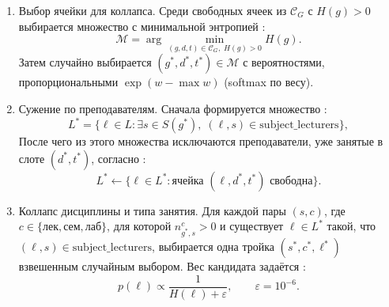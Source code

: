 \begin{enumerate}
	\item Выбор ячейки для коллапса.
	Среди свободных ячеек из $\mathcal{C}_G$ с $H(g)>0$ выбирается множество
	с минимальной энтропией :
	\begin{equation}
		\mathcal{M}=\arg\min_{(g,d,t)\in\mathcal{C}_G,\;H(g)>0} H(g).
		\label{eq:wfc-min-entropy}
	\end{equation}
	Затем случайно выбирается $(g^{*}, d^{*}, t^{*}) \in \mathcal{M}$
	с вероятностями, пропорциональными $\exp(w-\max w)$
	(softmax по весу).

	\item Сужение по преподавателям.
	Сначала формируется множество :
	\begin{equation}
		L^{*}=\{\ell \in L : \exists s \in S(g^{*}),\; (\ell,s)\in\mathrm{subject\_lecturers}\},
		\label{eq:wfc-lecturers}
	\end{equation}
	После чего из этого множества исключаются преподаватели, уже занятые
	в слоте $(d^{*}, t^{*})$, согласно :
	\begin{equation}
		L^{*}\leftarrow \{\ell \in L^{*} : \text{ячейка }(\ell,d^{*},t^{*})\text{ свободна}\}.
		\label{eq:wfc-lecturers-free}
	\end{equation}

	\item Коллапс дисциплины и типа занятия.
	Для каждой пары $(s,c)$, где $c\in\{\mathrm{лек},\mathrm{сем},\mathrm{лаб}\}$,
	для которой $n^c_{g^{*},s}>0$ и существует $\ell\in L^{*}$ такой, что
	$(\ell,s)\in\mathrm{subject\_lecturers}$, выбирается одна тройка
	$(s^{*},c^{*},\ell^{*})$ взвешенным случайным выбором.
	Вес кандидата задаётся :
	\begin{equation}
		p(\ell)\propto \frac{1}{H(\ell)+\varepsilon},
		\qquad \varepsilon=10^{-6}.
		\label{eq:wfc-candidate-prob}
	\end{equation}


\end{enumerate}
